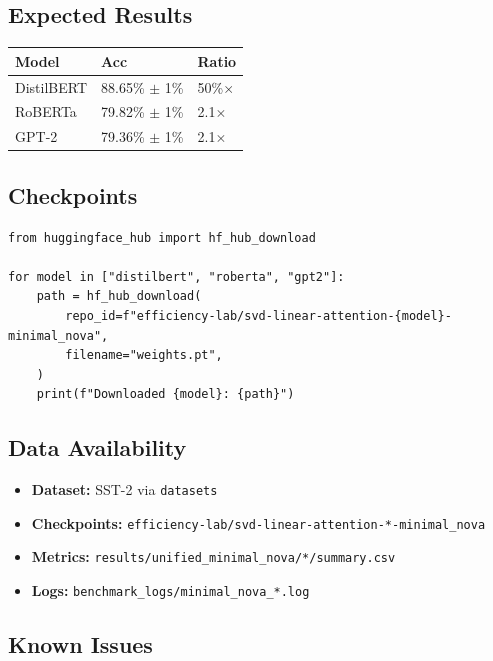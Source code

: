 \subsection{Expected Results}

\begin{table}[H]
\centering
\small
\begin{tabular}{lll}
\toprule
\textbf{Model} & \textbf{Acc} & \textbf{Ratio} \\
\midrule
DistilBERT & 88.65\% $\pm$ 1\% & 50\%$\times$ \\
RoBERTa & 79.82\% $\pm$ 1\% & 2.1$\times$ \\
GPT-2 & 79.36\% $\pm$ 1\% & 2.1$\times$ \\
\bottomrule
\end{tabular}
\end{table}

\subsection{Checkpoints}

\begin{lstlisting}
from huggingface_hub import hf_hub_download

for model in ["distilbert", "roberta", "gpt2"]:
    path = hf_hub_download(
        repo_id=f"efficiency-lab/svd-linear-attention-{model}-minimal_nova",
        filename="weights.pt",
    )
    print(f"Downloaded {model}: {path}")
\end{lstlisting}

\subsection{Data Availability}

\begin{itemize}
\item \textbf{Dataset:} SST-2 via \texttt{datasets}
\item \textbf{Checkpoints:} \texttt{efficiency-lab/svd-linear-attention-*-minimal\_nova}
\item \textbf{Metrics:} \texttt{results/unified\_minimal\_nova/*/summary.csv}
\item \textbf{Logs:} \texttt{benchmark\_logs/minimal\_nova\_*.log}

\end{itemize}
\subsection{Known Issues}


